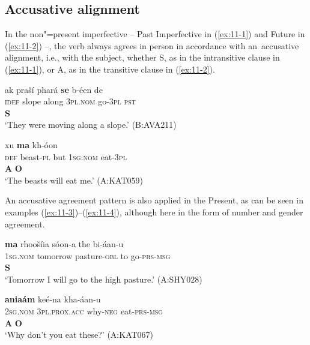 \subsection{Accusative alignment}
\label{subsec:11-1-1}


In the non"=present imperfective -- Past Imperfective in (\ref{ex:11-1}) and Future in (\ref{ex:11-2}) --, the verb always agrees in person in accordance with an~accusative alignment, i.e., with the subject, whether S, as in the intransitive clause in (\ref{ex:11-1}), or A, as in the transitive clause in (\ref{ex:11-2}). 

\begin{exe}
\ex
\label{ex:11-1}
\glll ak praší phará \textbf{se} b-éen de \\
\textsc{idef} slope along \textsc{3pl.nom} go-\textsc{3pl} \textsc{pst} \\
{} {} {}  \textbf{S} \\
\glt `They were moving along a slope.' (B:AVA211)

\ex
\label{ex:11-2}
 xu \textbf{ma} kh-óon \\
\textsc{def} beast-\textsc{pl} but \textsc{1sg.nom} eat-\textsc{3pl} \\
 \textbf{A} {} {}  \textbf{O} \\
\glt `The beasts will eat me.' (A:KAT059)
\end{exe}

An accusative agreement pattern is also applied in the Present, as can be seen in examples (\ref{ex:11-3})--(\ref{ex:11-4}), although here in the form of number and gender agreement.

\begin{exe}
\ex
\label{ex:11-3}
\glll \textbf{ma} rhoošíia sóon-a the bi-áan-u \\
\textsc{1sg.nom} tomorrow pasture-\textsc{obl} to go-\textsc{prs-}\textsc{msg} \\
\textbf{S} \\
\glt `Tomorrow I will go to the high pasture.' (A:SHY028)

\ex
\label{ex:11-4}
\glll [tu] \textbf{aniaám} keé-na kha-áan-u \\
\textsc{2sg.nom} \textsc{3pl.prox.acc} why-\textsc{neg} eat-\textsc{prs-}\textsc{msg} \\
\textbf{A} \textbf{O} \\
\glt `Why don't you eat these?' (A:KAT067)
\end{exe}

